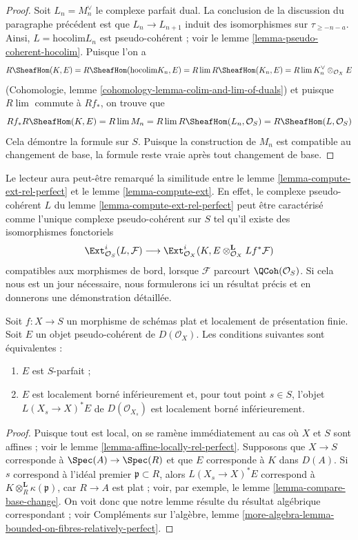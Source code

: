 \begin{proof}
\medskip\noindent
Soit $L_n = M_n^\vee$ le complexe parfait dual. La
conclusion de la discussion du paragraphe précédent est que
$L_n \to L_{n + 1}$ induit des isomorphismes sur $\tau_{\geq -n - a}$.
Ainsi, $L = \text{hocolim} L_n$ est pseudo-cohérent ; voir le
lemme \ref{lemma-pseudo-coherent-hocolim}.
Puisque l'on a
$$
R\SheafHom(K, E) = R\SheafHom(\text{hocolim} K_n, E) =
R\lim R\SheafHom(K_n, E) = R\lim K_n^\vee \otimes_{\mathcal{O}_X} E
$$
(Cohomologie, lemme \ref{cohomology-lemma-colim-and-lim-of-duals})
et puisque $R\lim$ commute à $Rf_*$, on trouve que
$$
Rf_*R\SheafHom(K, E) = R\lim M_n = R\lim R\SheafHom(L_n, \mathcal{O}_S) =
R\SheafHom(L, \mathcal{O}_S)
$$
Cela démontre la formule sur $S$. Puisque la construction de $M_n$ est
compatible au changement de base, la formule reste vraie après
tout changement de base.
\end{proof}

\begin{remark}
\label{remark-compare-L}
Le lecteur aura peut-être remarqué la similitude entre le
lemme \ref{lemma-compute-ext-rel-perfect} et le
lemme \ref{lemma-compute-ext}.
En effet, le complexe pseudo-cohérent $L$ du
lemme \ref{lemma-compute-ext-rel-perfect}
peut être caractérisé comme l'unique complexe pseudo-cohérent
sur $S$ tel qu'il existe des isomorphismes fonctoriels
$$
\Ext^i_{\mathcal{O}_S}(L, \mathcal{F}) \longrightarrow
\Ext^i_{\mathcal{O}_X}(K,
E \otimes_{\mathcal{O}_X}^\mathbf{L} Lf^*\mathcal{F})
$$
compatibles aux morphismes de bord, lorsque $\mathcal{F}$ parcourt
$\QCoh(\mathcal{O}_S)$. Si cela nous est un jour nécessaire, nous
formulerons ici un résultat précis et en donnerons une démonstration détaillée.
\end{remark}

\begin{lemma}
\label{lemma-bounded-on-fibres}
Soit $f : X \to S$ un morphisme de schémas plat et
localement de présentation finie. Soit $E$ un objet pseudo-cohérent
de $D(\mathcal{O}_X)$. Les conditions suivantes sont équivalentes :
\begin{enumerate}
\item $E$ est $S$-parfait ;
\item $E$ est localement borné inférieurement et, pour tout point $s \in S$,
l'objet $L(X_s \to X)^*E$ de $D(\mathcal{O}_{X_s})$
est localement borné inférieurement.
\end{enumerate}
\end{lemma}

\begin{proof}
Puisque tout est local, on se ramène immédiatement au
cas où $X$ et $S$ sont affines ; voir le lemme
\ref{lemma-affine-locally-rel-perfect}.
Supposons que $X \to S$ corresponde à $\Spec(A) \to \Spec(R)$ et que
$E$ corresponde à $K$ dans $D(A)$. Si $s$ correspond à
l'idéal premier $\mathfrak p \subset R$, alors $L(X_s \to X)^*E$
correspond à $K \otimes_R^\mathbf{L} \kappa(\mathfrak p)$,
car $R \to A$ est plat ; voir, par exemple, le
lemme \ref{lemma-compare-base-change}.
On voit donc que notre lemme résulte du résultat algébrique
correspondant ; voir Compléments sur l'algèbre, lemme
\ref{more-algebra-lemma-bounded-on-fibres-relatively-perfect}.
\end{proof}

